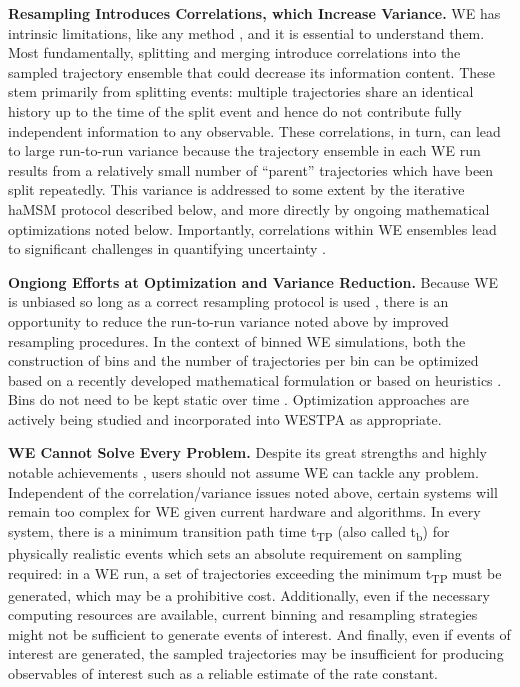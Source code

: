 \textbf{Resampling Introduces Correlations, which Increase Variance.} WE has intrinsic limitations, like any method \citep{chong_path-sampling_2017}, and it is essential to understand them. 
Most fundamentally, splitting and merging introduce correlations into the sampled trajectory ensemble that could decrease its information content. 
These stem primarily from splitting events: multiple trajectories share an identical history up to the time of the split event and hence do not contribute fully independent information to any observable.
These correlations, in turn, can lead to large run-to-run variance \citep{adhikari_computational_2019} because the trajectory ensemble in each WE run results from a relatively small number of “parent” trajectories which have been split repeatedly.
This variance is addressed to some extent by the iterative haMSM protocol described below, and more directly by ongoing mathematical optimizations noted below.  
Importantly, correlations within WE ensembles lead to significant challenges in quantifying uncertainty \citep{zuckerman_weighted_2017,mostofian_statistical_2019}.

\textbf{Ongiong Efforts at Optimization and Variance Reduction.} Because WE is unbiased so long as a correct resampling protocol is used \citep{zhang_exact_2010}, there is an opportunity to reduce the run-to-run variance noted above by improved resampling procedures. 
In the context of binned WE simulations, both the construction of bins and the number of trajectories per bin can be optimized based on a recently developed mathematical formulation \citep{aristoff_analysis_2018, aristoff_optimizing_2020} or based on heuristics \citep{torrillo_minimal_2021}. 
Bins do not need to be kept static over time \citep{zhang_exact_2010,dickson_wexplore_2014,torrillo_minimal_2021}. 
Optimization approaches are actively being studied and incorporated into WESTPA as appropriate.

\textbf{WE Cannot Solve Every Problem.} Despite its great strengths and highly notable achievements \citep{lotz_unbiased_2018, sztain_glycan_2021, adhikari_computational_2019}, users should not assume WE can tackle any problem.
Independent of the correlation/variance issues noted above, certain systems will remain too complex for WE given current hardware and algorithms.
In every system, there is a minimum transition path time t\textsubscript{TP} (also called t\textsubscript{b}) \citep{zuckerman_transition_2002, zhang_efficient_2007} for physically realistic events which sets an absolute requirement on sampling required: in a WE run, a set of trajectories exceeding the minimum t\textsubscript{TP} must be generated, which may be a prohibitive cost.
Additionally, even if the necessary computing resources are available, current binning and resampling strategies might not be sufficient to generate events of interest. 
And finally, even if events of interest are generated, the sampled trajectories may be insufficient for producing observables of interest such as a reliable estimate of the rate constant.


